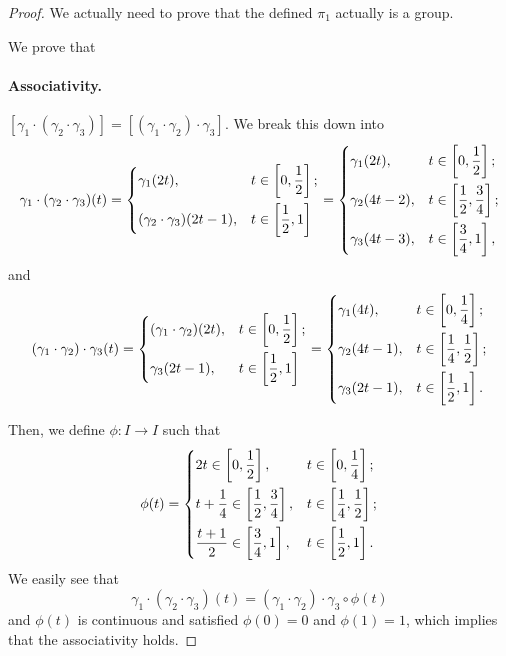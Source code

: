\begin{proof}
	We actually need to prove that the defined \(\pi _1\) actually is a group.

	\par We prove that
	\paragraph{Associativity.} \([\gamma_{1}\cdot (\gamma_2\cdot \gamma_3)] = [(\gamma_1\cdot \gamma_2)\cdot \gamma_3]\). We break this down into
	\[
		\gamma_1\cdot(\gamma_2\cdot \gamma_3)(t) = \begin{dcases}
			\gamma_{1}(2t ),                 & t\in\left[0, \frac{1}{2}\right]; \\
			(\gamma_2\cdot \gamma_3)(2t-1) , & t\in\left[\frac{1}{2}, 1\right]
		\end{dcases} = \begin{dcases}
			\gamma_{1}(2t ), & t\in\left[0, \frac{1}{2}\right];           \\
			\gamma_2(4t-2) , & t\in\left[\frac{1}{2}, \frac{3}{4}\right]; \\
			\gamma_3(4t-3) , & t\in\left[\frac{3}{4}, 1\right],
		\end{dcases}
	\]
	and
	\[
		(\gamma_1\cdot\gamma_2)\cdot \gamma_3(t) = \begin{dcases}
			(\gamma_{1}\cdot \gamma_2) (2t ), & t\in\left[0, \frac{1}{2}\right]; \\
			\gamma_3(2t-1) ,                  & t\in\left[\frac{1}{2}, 1\right]
		\end{dcases} = \begin{dcases}
			\gamma_{1}(4t),  & t\in\left[0, \frac{1}{4}\right];           \\
			\gamma_2(4t-1) , & t\in\left[\frac{1}{4}, \frac{1}{2}\right]; \\
			\gamma_3(2t-1) , & t\in\left[\frac{1}{2}, 1\right].
		\end{dcases}
	\]

	\par Then, we define \(\phi \colon I\to I\) such that
	\[
		\phi (t) = \begin{dcases}
			2t\in\left[0, \frac{1}{2}\right],                      & t\in\left[0, \frac{1}{4}\right];           \\
			t+\frac{1}{4}\in\left[\frac{1}{2}, \frac{3}{4}\right], & t\in\left[\frac{1}{4}, \frac{1}{2}\right]; \\
			\frac{t+1}{2}\in\left[\frac{3}{4}, 1\right],           & t\in\left[\frac{1}{2}, 1\right].
		\end{dcases}
	\]
	We easily see that
	\[
		\gamma_1\cdot(\gamma_2\cdot \gamma_3)(t) = (\gamma_1\cdot\gamma_2)\cdot \gamma_{3}\circ \phi (t)
	\]
	and \(\phi (t)\) is continuous and satisfied \(\phi (0) = 0\) and \(\phi (1) = 1\), which implies that the associativity holds.


\end{proof}
